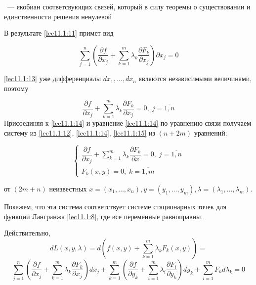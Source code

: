 \documentclass[../../main.tex]{subfiles}
\begin{document}
	~--- якобиан соответсвующих связей, который в силу теоремы о существовании
	и единственности решения ненулевой 
	
	
	В результате \eqref{lec11.1:11} примет вид
	
	\begin{equation}
	\label{lec11.1:13}
	\sum\limits_{j=1}^{n}\left(  \dfrac{\partial f }{\partial x_j} + 
	\sum\limits_{k=1}^{m} \lambda_k\dfrac{\partial F_k }{\partial x_j}  
	\right) \partial x_j =0 
	\end{equation}
	
	\eqref{lec11.1:13} уже дифференциалы
	$d x_1,\ldots,d x_n$ являются независимыми величинами, поэтому
	
	\[
	\label{lec11.1:14}
	\dfrac{\partial f }{\partial x_j} + \sum\limits_{k=1}^{m}
	\lambda_k \dfrac{\partial F_k }{\partial x_j} = 0,\; j = \overline{1, n}
	\]
	Присоединяя к \eqref{lec11.1:14}  и уравнение \eqref{lec11.1:14} по 
	уравнению связи получаем \smallskip систему из \eqref{lec11.1:12}, 
	\eqref{lec11.1:14},
	\eqref{lec11.1:15} из $ \left( n + 2m \right) $ уравнений:
	
	\begin{equation}
	\label{lec11.1:15}
	\begin{cases}
	\dfrac{\partial f }{\partial x_j} + \sum\limits_{k=1}^{m}
	\lambda_k \dfrac{\partial F_k }{\partial x} = 0,\; j = \overline{1, n}\\
	F_k\left( x, y \right) = 0,\; k = \overline{1, m}
	\end{cases}
	\end{equation}
	
	от $ \left( 2m + n \right) $ неизвестных $x = \left( x_1, \ldots, x_n \right),
	y = \left( y_1, \ldots, y_m \right), \lambda = \left( \lambda_1,
	\ldots, \lambda_m \right) $.
	
	Покажем, что эта система соответствует системе стационарных точек для
	функции Лангранжа \eqref{lec11.1:8}, где все переменные равноправны.
	
	Действительно, 
	\[dL\left( x, y, \lambda \right) = d\left( f\left( x, y\right) 
	+ \sum\limits_{k=1}^{m}\lambda_k F_k\left( x, y \right) \right) =\]
	\[
	\sum\limits_{j=1}^{n}\left( \dfrac{\partial f}{\partial x_j} 
	+ \sum\limits_{k=1}^{m}\lambda_k \dfrac{\partial F_k}{\partial x_j}  
	\right)d x_j + \sum\limits_{k=1}^{m} \left( \dfrac{\partial f}{\partial y_k} 
	+ \sum\limits_{i=1}^{m}\lambda_i \dfrac{\partial F_i}{\partial y_k}  \right)
	d 	y_k + \sum\limits_{i=1}^{m} F_k d \lambda_k = 0\]
	
\end{document}

